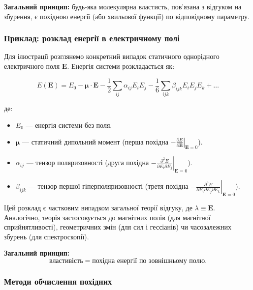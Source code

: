 \textbf{Загальний принцип:} будь-яка молекулярна властисть, пов'язана з відгуком на збурення, є похідною енергії (або хвильової функції) по відповідному параметру.

\subsubsection*{Приклад: розклад енергії в електричному полі}

Для ілюстрації розглянемо конкретний випадок статичного однорідного електричного поля $\mathbf{E}$. Енергія системи розкладається як:

\[
E(\mathbf{E}) = E_0 - \boldsymbol{\mu} \cdot \mathbf{E}
- \frac{1}{2}\sum_{ij} \alpha_{ij} E_i E_j
- \frac{1}{6}\sum_{ijk} \beta_{ijk} E_i E_j E_k + \ldots
\]

де:
\begin{itemize}
    \item $E_0$ --- енергія системи без поля.
    \item $\boldsymbol{\mu}$ --- статичний дипольний момент (перша похідна $\left. -\frac{\partial E}{\partial \mathbf{E}} \right|_{\mathbf{E}=0}$).
    \item $\alpha_{ij}$ --- тензор поляризовності (друга похідна $\left. -\frac{\partial^2 E}{\partial E_i \partial E_j} \right|_{\mathbf{E}=0}$).
    \item $\beta_{ijk}$ --- тензор першої гіперполяризовності (третя похідна $\left. -\frac{\partial^3 E}{\partial E_i \partial E_j \partial E_k} \right|_{\mathbf{E}=0}$).
\end{itemize}

Цей розклад є частковим випадком загальної теорії відгуку, де $\lambda \equiv \mathbf{E}$. Аналогічно, теорія застосовується до магнітних полів (для магнітної сприйнятливості), геометричних змін (для сил і гессіанів) чи часозалежних збурень (для спектроскопії).

\textbf{Загальний принцип:}
\begin{equation*}
     \text{властивість} = \text{похідна енергії по зовнішньому полю}.
\end{equation*}

\subsubsection*{Методи обчислення похідних}

